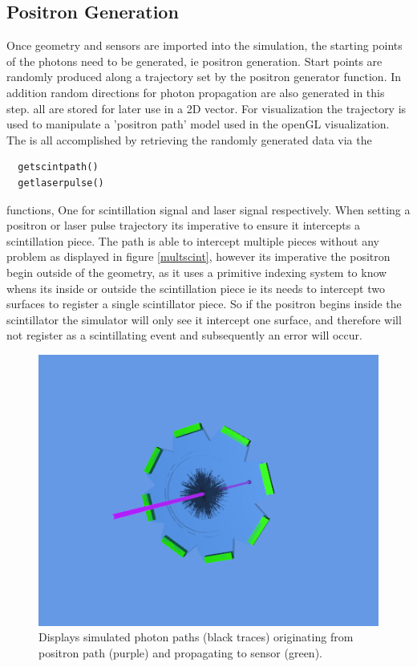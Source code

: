 \documentclass[paper=a4, fontsize=11pt]{scrartcl}
\numberwithin{equation}{section}		%
\numberwithin{figure}{section}			%
\numberwithin{table}{section}				%
\begin{document}
\subsection{Positron Generation}
Once geometry and sensors are imported into the simulation, the starting points of the photons need to be generated, ie positron generation. Start points are randomly produced along a trajectory set by the positron generator function. In addition random directions for photon propagation are also generated in this step. all are stored for later use in a 2D vector. For visualization the trajectory is used to manipulate a 'positron path' model used in the openGL visualization. The is all accomplished by retrieving the randomly generated data via the 
\begin{verbatim}
  getscintpath()
  getlaserpulse()
 \end{verbatim} 
functions, One for scintillation signal and laser signal respectively. When setting a positron or laser pulse trajectory its imperative to ensure it intercepts a scintillation piece. The path is able to intercept multiple pieces without any problem as displayed in figure \ref{multscint}, however its imperative the positron begin outside of the geometry, as it uses a primitive indexing system to know whens its inside or outside the scintillation piece ie its needs to intercept two surfaces to register a single scintillator piece. So if the positron begins inside the scintillator the simulator will only see it intercept one surface, and therefore will not register as a scintillating event and subsequently an error will occur. 

\begin{figure}[h!]
\centering
\includegraphics[width=0.70\linewidth]{posi2.png}
\caption{Displays simulated photon paths (black traces) originating from positron path (purple) and propagating to sensor (green).}
\label{simpic}
\end{figure}
\end{document}
